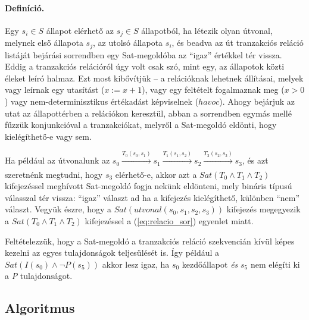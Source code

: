 \paragraph{Definíció.}
Egy $s_i \in S$ állapot elérhető az $s_j \in S$ állapotból, ha létezik olyan útvonal, melynek első állapota $s_j$, az utolsó állapota $s_i$, és beadva az út tranzakciós reláció listáját bejárási sorrendben egy Sat-megoldóba az ``igaz'' értékkel tér vissza.
\newline
\newline
Eddig a tranzakciós relációról úgy volt csak szó, mint egy, az állapotok közti éleket leíró halmaz. Ezt most kibővítjük -- a relációknak lehetnek állításai, melyek vagy leírnak egy utasítást ($x := x + 1$), vagy egy feltételt fogalmaznak meg ($x > 0$) vagy nem-determinisztikus értékadást képviselnek ($\mathit{havoc}$). Ahogy bejárjuk az utat az állapottérben a relációkon keresztül, abban a sorrendben egymás mellé fűzzük konjunkcióval a tranzakciókat, melyről a Sat-megoldó eldönti, hogy kielégíthető-e vagy sem.
\\
\begin{example}
	Ha például az útvonalunk az $s_0 \xrightarrow[\text{}]{\text{$T_0(s_0, s_1)$}} s_1 \xrightarrow[\text{}]{\text{$T_1(s_1, s_2)$}} s_2 \xrightarrow[\text{}]{\text{$T_2(s_2, s_3)$}} s_3$, és azt szeretnénk megtudni, hogy $s_3$ elérhető-e, akkor azt a $\mathit{Sat}(T_0 \wedge T_1 \wedge T_2)$ kifejezéssel meghívott Sat-megoldó fogja nekünk eldönteni, mely bináris típusú válasszal tér vissza: ``igaz'' választ ad ha a kifejezés kielégíthető, különben ``nem'' választ. Vegyük észre, hogy a $\mathit{Sat}(\mathit{utvonal}(s_0, s_1, s_2, s_3))$ kifejezés megegyezik a $\mathit{Sat}(T_0 \wedge T_1 \wedge T_2)$ kifejezéssel a (\ref{eq:relacio_sor}) egyenlet miatt.
\end{example}
Feltételezzük, hogy a Sat-megoldó a tranzakciós reláció szekvencián kívül képes kezelni az egyes tulajdonságok teljesülését is. Így például a $\mathit{Sat}(I(s_0) \wedge \neg P(s_5))$ akkor lesz igaz, ha $s_0$ kezdőállapot \emph{és} $s_5$ nem elégíti ki a \emph{P} tulajdonságot.

\subsection{Algoritmus}

